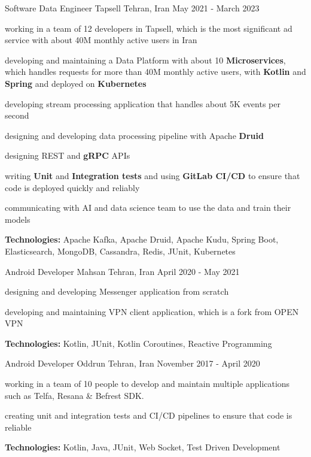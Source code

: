 \begin{cventries}
    \cventry
    {Software Data Engineer} %
    {Tapsell} %
    {Tehran, Iran} %
    {May 2021 - March 2023} %
    {
      \begin{cvitems} %
        \item working in a team of 12 developers in Tapsell, which is the most significant ad service with about 40M monthly active users in Iran
        \item developing and maintaining a Data Platform with about 10 \textbf{Microservices}, which handles requests for more than 40M monthly active users, with \textbf{Kotlin} and 
        \textbf{Spring} and deployed on \textbf{Kubernetes} 
        \item developing stream processing application that handles about 5K events per second
        \item designing and developing data processing pipeline with Apache \textbf{Druid}
        \item designing REST and \textbf{gRPC} APIs
        \item writing \textbf{Unit} and \textbf{Integration tests} and using \textbf{GitLab CI/CD} to ensure that code is deployed quickly and reliably
        \item communicating with AI and data science team to use the data and train their models
        \item \textbf{Technologies:} Apache Kafka, Apache Druid, Apache Kudu, Spring Boot, Elasticsearch, MongoDB, Cassandra, Redis, JUnit, Kubernetes
      \end{cvitems}
    }

    \cventry
    {Android Developer} %
    {Mahsan} %
    {Tehran, Iran} %
    {April 2020 - May 2021} %
    {
      \begin{cvitems} %
        \item designing and developing Messenger application from scratch
        \item developing and maintaining VPN client application, which is a fork from OPEN VPN
        \item \textbf{Technologies:} Kotlin, JUnit, Kotlin Coroutines, Reactive Programming
      \end{cvitems}
    }

    \cventry
    {Android Developer} %
    {Oddrun} %
    {Tehran, Iran} %
    {November 2017 - April 2020} %
    { 
      \begin{cvitems} %
        \item working in a team of 10 people to develop and maintain multiple applications such as Telfa, Resana \& Befrest SDK.
        \item creating unit and integration tests and CI/CD pipelines to ensure that code is reliable
        \item \textbf{Technologies:} Kotlin, Java, JUnit, Web Socket, Test Driven Development
      \end{cvitems}
    }

\end{cventries}
